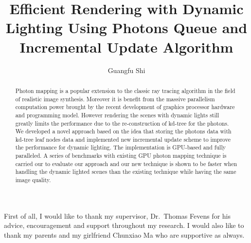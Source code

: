 \documentclass[12pt]{report}
\author{Guangfu Shi}
\title{Efficient Rendering with Dynamic Lighting Using Photons Queue and Incremental Update Algorithm}
\begin{document}
 
\begin{abstract}

Photon mapping is a popular extension to the classic ray tracing algorithm in the field of realistic image synthesis. Moreover  it is benefit from the massive parallelism computation power brought by the recent development of graphics processor hardware and programming model. However rendering the scenes with dynamic lights still greatly limits the performance due to the re-construction of kd-tree for the photons. We developed a novel approach based on the idea that storing the photons data with kd-tree leaf nodes data and implemented new incremental update scheme to improve the performance for dynamic lighting. The implementation is GPU-based and fully paralleled. A series of benchmarks with existing GPU photon mapping technique is carried our to evaluate our approach and our new technique is shown to be faster when handling the dynamic lighted scenes than the existing technique while having the same image quality. 

\end{abstract}


\begin{acknowledgments}
First of all, I would like to thank my supervisor, Dr.~Thomas Fevens for his advice, encouragement and support throughout my research. I would also like to thank my parents and my girlfriend Chunxiao Ma who are supportive as always.
\end{acknowledgments}


\setcounter{page}{1}

\begin{spacing}{2.0}
	








	

		

%				

 


\end{spacing}
\end{document}

